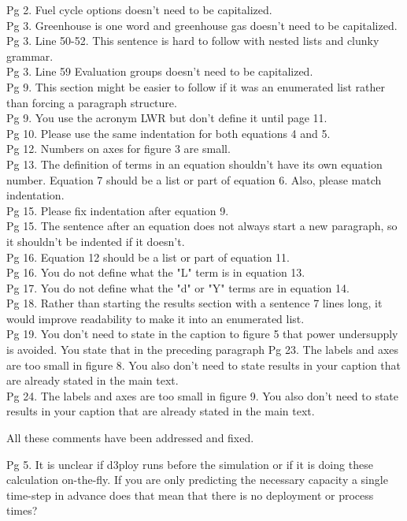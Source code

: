 \documentclass[answers,11pt]{exam}
\begin{document}
\begin{questions}
Pg 2. Fuel cycle options doesn't need to be capitalized. \\
Pg 3. Greenhouse is one word and greenhouse gas doesn't need to be capitalized. \\
Pg 3. Line 50-52. This sentence is hard to follow with nested lists and clunky grammar.\\
Pg 3. Line 59 Evaluation groups doesn't need to be capitalized. \\
Pg 9. This section might be easier to follow if it was an enumerated list rather than forcing a paragraph structure.\\
Pg 9. You use the acronym LWR but don't define it until page 11.\\
Pg 10. Please use the same indentation for both equations 4 and 5.\\
Pg 12. Numbers on axes for figure 3 are small.\\
Pg 13. The definition of terms in an equation shouldn't have its own equation number. Equation 7 should be a list or part of equation 6. Also, please match indentation.\\
Pg 15. Please fix indentation after equation 9.\\
Pg 15. The sentence after an equation does not always start a new paragraph, so it shouldn't be indented if it doesn't.\\
Pg 16. Equation 12 should be a list or part of equation 11. \\
Pg 16. You do not define what the "L" term is in equation 13.\\
Pg 17. You do not define what the "d" or "Y" terms are in equation 14.\\
Pg 18. Rather than starting the results section with a sentence 7 lines long, it would improve readability to make it into an enumerated list.\\
Pg 19. You don't need to state in the caption to figure 5 that power undersupply is avoided. You state that in the preceding paragraph
Pg 23. The labels and axes are too small in figure 8. You also don't need to state results in your caption that are already stated in the main text.\\
Pg 24. The labels and axes are too small in figure 9. You also don't need to state results in your caption that are already stated in the main text.\\
\begin{solution}
All these comments have been addressed and fixed. 
\end{solution}

\question
Pg 5. It is unclear if d3ploy runs before the simulation or if it is 
doing these calculation on-the-fly. If you are only predicting the 
necessary capacity a single time-step in advance does that mean that 
there is no deployment or process times?

\end{questions}


  
\end{document}
